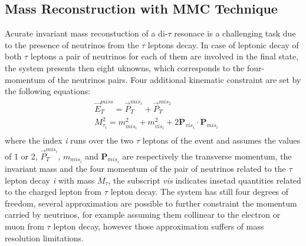 \subsection{Mass Reconstruction with MMC Technique}\label{sec:mmc}

Acurate invariant mass reconstuction of a di-$\tau$ resonace is a challenging task
due to the presence of neutrinos from the $\tau$ leptons decay. 
In case of leptonic decay of both $\tau$ leptons a pair of neutrinos for each
of them are involved in the final state,  the system presents then eight uknowns, which corresponds to the four-momentum of the neutrinos pairs.
Four additional kinematic constraint are set by the following equations:
\begin{equation} \label{eq:MMC}
\begin{split}
&\vec{E}_T^{miss} = \vec{P}_{T}^{mis_{1}} +  \vec{P}_{T}^{mis_2} \\
&M_{\tau_{i}}^2 = m^2_{mis_{i}} + m^2_{vis_{i}} + 2 \mathbf{P}_{vis_i} \cdot \mathbf{P}_{mis_i} \\
\end{split}
\end{equation}
where the index \emph{i} runs over the two $\tau$ leptons of the event and assumes the values of 1 or 2, 
$\vec{P}_{T}^{mis_{i}}$, $m_{mis_{i}}$ and $\mathbf{P}_{mis_{i}}$ are respectively the transverse momentum, the invariant mass and 
the four momentum of the pair of neutrinos related to the  $\tau$ lepton decay \emph{i} with mass $M_{\tau}$, the subscript \emph{vis} indicates insetad 
quantities related to the charged lepton from  $\tau$ lepton decay. The system has still four degrees of freedom,
several approximation are possible to further constraint the momentum carried by neutrinos,
for example assuming them collinear to the electron or muon from $\tau$ lepton decay, however those approximation 
suffers of mass resolution limitations.

